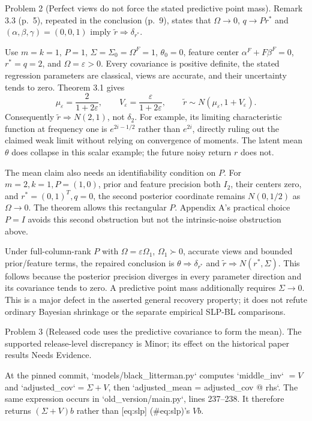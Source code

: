 \documentclass[10pt]{article}
\begin{document}
Problem 2 (Perfect views do not force the stated predictive point mass).  Remark 3.3 (p. 5), repeated in the conclusion (p. 9), states that \(\Omega\to0\), \(q\to Pr^*\) and \((\alpha,\beta,\gamma)=(0,0,1)\) imply \(\widetilde r\Rightarrow\delta_{r^*}\).\par
Use \(m=k=1\), \(P=1\), \(\Sigma=\Sigma_0=\Omega^F=1\), \(\theta_0=0\), feature center \(\alpha^F+F\beta^F=0\), \(r^*=q=2\), and \(\Omega=\varepsilon>0\). Every covariance is positive definite, the stated regression parameters are classical, views are accurate, and their uncertainty tends to zero. Theorem 3.1 gives \[\mu_\varepsilon=\frac2{1+2\varepsilon},\qquad
 V_\varepsilon=\frac{\varepsilon}{1+2\varepsilon},\qquad
 \widetilde r\sim N(\mu_\varepsilon,1+V_\varepsilon).\] Consequently \(\widetilde r\Rightarrow N(2,1)\), not \(\delta_2\). For example, its limiting characteristic function at frequency one is \(e^{2i-1/2}\) rather than \(e^{2i}\), directly ruling out the claimed weak limit without relying on convergence of moments. The latent mean \(\theta\) does collapse in this scalar example; the future noisy return \(r\) does not.\par
The mean claim also needs an identifiability condition on \(P\). For \(m=2,k=1,P=(1,0)\), prior and feature precision both \(I_2\), their centers zero, and \(r^*=(0,1)^T,q=0\), the second posterior coordinate remains \(N(0,1/2)\) as \(\Omega\to0\). The theorem allows this rectangular \(P\). Appendix A’s practical choice \(P=I\) avoids this second obstruction but not the intrinsic-noise obstruction above.\par
Under full-column-rank \(P\) with \(\Omega=\varepsilon\Omega_1\), \(\Omega_1\succ0\), accurate views and bounded prior/feature terms, the repaired conclusion is \(\theta\Rightarrow\delta_{r^*}\) and \(\widetilde r\Rightarrow N(r^*,\Sigma)\). This follows because the posterior precision diverges in every parameter direction and its covariance tends to zero. A predictive point mass additionally requires \(\Sigma\to0\). This is a major defect in the asserted general recovery property; it does not refute ordinary Bayesian shrinkage or the separate empirical SLP-BL comparisons.\par
Problem 3 (Released code uses the predictive covariance to form the mean).  The supported release-level discrepancy is Minor; its effect on the historical paper results Needs Evidence.\par
At the pinned commit, `models/black\_litterman.py` computes `middle\_inv` \(=V\) and `adjusted\_cov`\(=\Sigma+V\), then `adjusted\_mean = adjusted\_cov @ rhs`. The same expression occurs in `old\_version/main.py`, lines 237–238. It therefore returns \((\Sigma+V)b\) rather than [eq:slp] (\#eq:slp)’s \(Vb\).\par
\end{document}

